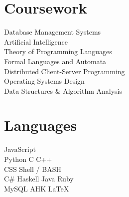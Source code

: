 \documentclass[]{resume}
\begin{document}
\begin{minipage}[t]{0.33\textwidth}
\section{Coursework}
Database Management Systems \\
Artificial Intelligence \\
Theory of Programming Languages \\
Formal Languages and Automata \\
Distributed Client-Server Programming \\
Operating Systems Design \\
Data Structures \& Algorithm Analysis \\

\sectionsep


\section{Languages}


JavaScript \\
Python \textbullet{} C \textbullet{} C++ \\%
CSS \textbullet{} Shell / BASH \\
C\# \textbullet{} Haskell \textbullet{} Java \textbullet{} Ruby \\
MySQL \textbullet{} AHK \textbullet{} \LaTeX \\


\end{minipage}
\end{document}
